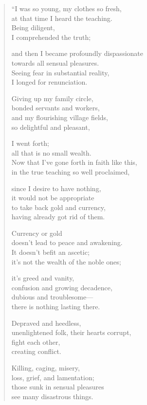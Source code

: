 \documentclass[12pt,openany]{book}%
\begin{document}
\begin{verse}%
“I was so young, my clothes so fresh, \\
at that time I heard the teaching. \\
Being diligent, \\
I comprehended the truth; 

and then I became profoundly dispassionate \\
towards all sensual pleasures. \\
Seeing fear in substantial reality, \\
I longed for renunciation. 

Giving up my family circle, \\
bonded servants and workers, \\
and my flourishing village fields, \\
so delightful and pleasant, 

I went forth; \\
all that is no small wealth. \\
Now that I’ve gone forth in faith like this, \\
in the true teaching so well proclaimed, 

since I desire to have nothing, \\
it would not be appropriate \\
to take back gold and currency, \\
having already got rid of them. 

Currency or gold \\
doesn’t lead to peace and awakening. \\
It doesn’t befit an ascetic; \\
it’s not the wealth of the noble ones; 

it’s greed and vanity, \\
confusion and growing decadence, \\
dubious and troublesome—\\
there is nothing lasting there. 

Depraved and heedless, \\
unenlightened folk, their hearts corrupt, \\
fight each other, \\
creating conflict. 

Killing, caging, misery, \\
loss, grief, and lamentation; \\
those sunk in sensual pleasures \\
see many disastrous things. 


\end{verse}
\end{document}
